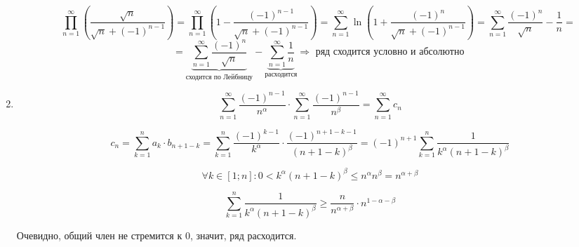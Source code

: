 \documentclass[11pt]{article}
\begin{document}
\begin{enumerate}
\begin{enumerate}
		$$\prod_{n=1}^{\infty} \left(
		\frac{\sqrt{n}}{\sqrt{n} + (-1)^{n-1}} \right) = \prod_{n=1}^{\infty} \left( 1 - 
		\frac{(-1)^{n-1}}{\sqrt{n} + (-1)^{n-1}} \right) = \sum_{n=1}^{\infty} \operatorname{ln} \left( 1 + 
		\frac{(-1)^{n}}{\sqrt{n} + (-1)^{n-1}} \right) = \sum_{n=1}^{\infty} \frac{(-1)^n}{\sqrt{n}} - \frac{1}{n} = $$ $$= \underbrace{\sum_{n=1}^{\infty} \frac{(-1)^n}{\sqrt{n}}}_{\text{сходится по Лейбницу}} -\underbrace{\sum_{n=1}^{\infty} \frac{1}{n}}_{\text{расходится}} \Rightarrow \text{ ряд сходится условно и абсолютно}$$
	\end{enumerate}
	\item  $$\sum_{n=1}^{\infty}\frac{(-1)^{n-1}}{n^{\alpha}} \cdot \sum_{n=1}^{\infty}\frac{(-1)^{n-1}}{n^{\beta}} =\sum_{n=1}^{\infty} c_n $$

	$$c_n = \sum_{k=1}^{n} a_k \cdot b_{n+1-k} = \sum_{k=1}^{n} \frac{(-1)^{k-1}}{k^{\alpha}} \cdot \frac{(-1)^{n+1 - k-1}}{(n+1-k)^{\beta}} = (-1)^{n+1} \sum_{k=1}^{n} \frac{1}{k^{\alpha}(n+1-k)^{\beta}}$$

	$$\forall k \in [1;n] : 0 < k^{\alpha}(n+1-k)^{\beta} \leq n^{\alpha} n^{\beta} =  n^{\alpha + \beta}$$

	$$\sum_{k=1}^{n} \frac{1}{k^{\alpha}(n+1-k)^{\beta}} \geq \frac{n}{n^{\alpha + \beta}} \cdot n^{1- \alpha - \beta}$$

Очевидно, общий член не стремится к 0, значит, ряд расходится.
		
	\end{enumerate}
\end{document}
